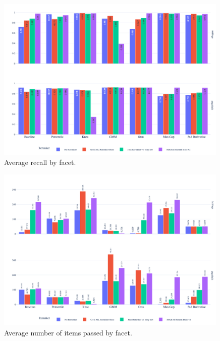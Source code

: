 \begin{figure}[htbp]
  \centering
  \includegraphics[width=0.99\textwidth]{reranker/avg_recall_bar_faceted.png}
  \caption{\footnotesize Average recall by facet.}
  \label{fig:avg_recall}
\end{figure}

\begin{figure}[htbp]
  \centering
  \includegraphics[width=0.99\textwidth]{reranker/avg_num_items_passed_bar_faceted.png}
  \caption{\footnotesize Average number of items passed by facet.}
  \label{fig:avg_num_items}
\end{figure}

